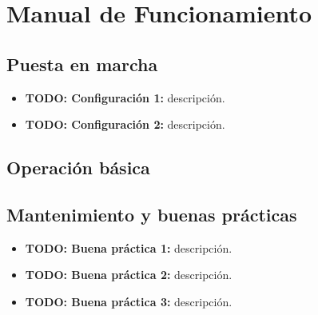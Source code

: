 \chapter{Manual de Funcionamiento}


\section{Puesta en marcha}


\begin{itemize}
    \item \textbf{TODO: Configuración 1:} descripción.
    \item \textbf{TODO: Configuración 2:} descripción.
\end{itemize}

\section{Operación básica}


\section{Mantenimiento y buenas prácticas}


\begin{itemize}
    \item \textbf{TODO: Buena práctica 1:} descripción.
    \item \textbf{TODO: Buena práctica 2:} descripción.
    \item \textbf{TODO: Buena práctica 3:} descripción.
\end{itemize}
